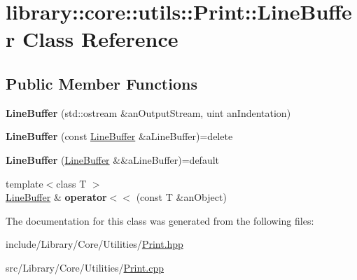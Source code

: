 \hypertarget{classlibrary_1_1core_1_1utils_1_1_print_1_1_line_buffer}{}\section{library\+:\+:core\+:\+:utils\+:\+:Print\+:\+:Line\+Buffer Class Reference}
\label{classlibrary_1_1core_1_1utils_1_1_print_1_1_line_buffer}
\subsection*{Public Member Functions}
\begin{DoxyCompactItemize}
\item 
\mbox{\label{classlibrary_1_1core_1_1utils_1_1_print_1_1_line_buffer_a241c89010e599cd15025fdaa240c66f8}} 
{\bfseries Line\+Buffer} (std\+::ostream \&an\+Output\+Stream, uint an\+Indentation)
\item 
\mbox{\label{classlibrary_1_1core_1_1utils_1_1_print_1_1_line_buffer_afc353daf14e3a1f76f6d7b73907e3bbe}} 
{\bfseries Line\+Buffer} (const \hyperlink{classlibrary_1_1core_1_1utils_1_1_print_1_1_line_buffer}{Line\+Buffer} \&a\+Line\+Buffer)=delete
\item 
\mbox{\label{classlibrary_1_1core_1_1utils_1_1_print_1_1_line_buffer_a45f71ed47bf91cb76c31135e04a60a7b}} 
{\bfseries Line\+Buffer} (\hyperlink{classlibrary_1_1core_1_1utils_1_1_print_1_1_line_buffer}{Line\+Buffer} \&\&a\+Line\+Buffer)=default
\item 
\mbox{\label{classlibrary_1_1core_1_1utils_1_1_print_1_1_line_buffer_aceff405c94de38866120abc55093762f}} 
{\footnotesize template$<$class T $>$ }\\\hyperlink{classlibrary_1_1core_1_1utils_1_1_print_1_1_line_buffer}{Line\+Buffer} \& {\bfseries operator$<$$<$} (const T \&an\+Object)
\end{DoxyCompactItemize}


The documentation for this class was generated from the following files\+:\begin{DoxyCompactItemize}
\item 
include/\+Library/\+Core/\+Utilities/\hyperlink{_print_8hpp}{Print.\+hpp}\item 
src/\+Library/\+Core/\+Utilities/\hyperlink{_print_8cpp}{Print.\+cpp}\end{DoxyCompactItemize}
